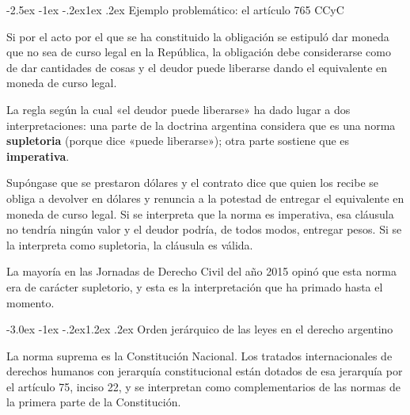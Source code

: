 \documentclass[12pt,oneside]{book}
\makeatletter
\renewcommand\section{\@startsection{section}{1}{\z@}%
  {-3.0ex \@plus -1ex \@minus -.2ex}{1.2ex \@plus .2ex}%
  {\normalfont\large\bfseries\color{acento}}}
\renewcommand\subsection{\@startsection{subsection}{2}{\z@}%
  {-2.5ex \@plus -1ex \@minus -.2ex}{1ex \@plus .2ex}%
  {\normalfont\normalsize\bfseries}}
\makeatother
\begin{document}
\subsection{Ejemplo problemático: el artículo 765 CCyC}

\begin{regla}
Si por el acto por el que se ha constituido la obligación se estipuló dar moneda que no sea de curso legal en la República, la obligación debe considerarse como de dar cantidades de cosas y el deudor puede liberarse dando el equivalente en moneda de curso legal.
\end{regla}

La regla según la cual «el deudor puede liberarse» ha dado lugar a dos interpretaciones: una parte de la doctrina argentina considera que es una norma \textbf{supletoria} (porque dice «puede liberarse»); otra parte sostiene que es \textbf{imperativa}.

\begin{ejemplo}
Supóngase que se prestaron dólares y el contrato dice que quien los recibe se obliga a devolver en dólares y renuncia a la potestad de entregar el equivalente en moneda de curso legal. Si se interpreta que la norma es imperativa, esa cláusula no tendría ningún valor y el deudor podría, de todos modos, entregar pesos. Si se la interpreta como supletoria, la cláusula es válida.
\end{ejemplo}

La mayoría en las Jornadas de Derecho Civil del año 2015 opinó que esta norma era de carácter supletorio, y esta es la interpretación que ha primado hasta el momento.

\section{Orden jerárquico de las leyes en el derecho argentino}

La norma suprema es la Constitución Nacional. Los tratados internacionales de derechos humanos con jerarquía constitucional están dotados de esa jerarquía por el artículo 75, inciso 22, y se interpretan como complementarios de las normas de la primera parte de la Constitución.
\end{document}
